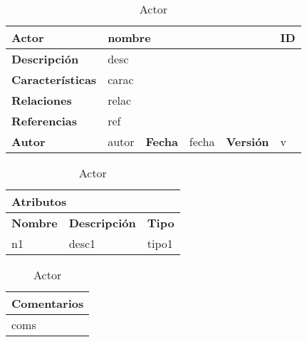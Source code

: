 \begin{table}[H]

\centering
\begin{tabular}{|m{3cm}|m{4cm}|m{2cm}|m{2cm}|m{2cm}|m{1cm}|}
\hline
\textbf{Actor} &  \multicolumn{4}{m{8cm}|}{nombre} \vline &  \cellcolor{gray!40}ID \\
\hline
\textbf{Descripción} & \multicolumn{5}{m{8cm}|}{desc} \\
\hline
\textbf{Características} & \multicolumn{5}{m{8cm}|}{carac} \\
\hline
\textbf{Relaciones} &\multicolumn{5}{m{8cm}|}{relac} \\
\hline
\textbf{Referencias} & \multicolumn{5}{m{8cm}|}{ref} \\
\hline
\textbf{Autor} & autor & \textbf{Fecha} & fecha & \textbf{Versión} & v \\
\hline
\end{tabular}

\vspace{1cm}

\begin{tabular}{|m{4cm}|m{7.3cm}|m{4cm}|}
\hline
\multicolumn{3}{|m{15.3cm}|}{\textbf{Atributos}} \\
\hline
\textbf{Nombre} & \textbf{Descripción} & \textbf{Tipo} \\
\hline
n1 & desc1 & tipo1 \\
\hline
\end{tabular}


\vspace{1cm}

\begin{tabular}{|m{16.2cm}|}
\hline
\textbf{Comentarios} \\
\hline
coms \\
\hline
\end{tabular}

\caption{Actor}

\end{table}